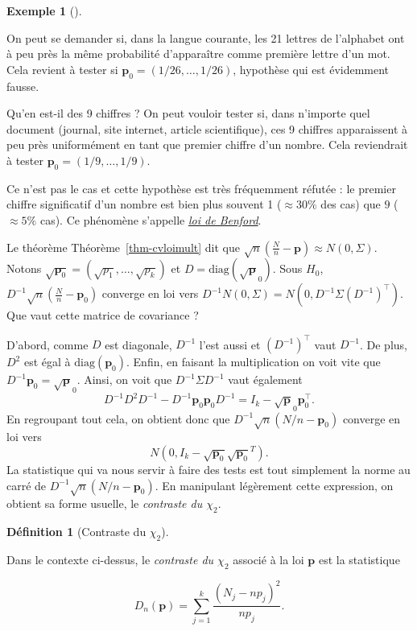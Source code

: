 \documentclass[
  10,
  letterpaper,
  DIV=11,
  numbers=noendperiod]{scrreport}
\theoremstyle{plain}
\theoremstyle{definition}
\theoremstyle{plain}
\theoremstyle{definition}
\newtheorem{definition}{Définition}[chapter]
\theoremstyle{definition}
\newtheorem{example}{Exemple}[chapter]
\theoremstyle{plain}
\theoremstyle{remark}
\begin{document}
\begin{example}[]\protect\hypertarget{exm-testadeq}{}\label{exm-testadeq}

On peut se demander si, dans la langue courante, les 21 lettres de
l'alphabet ont à peu près la même probabilité d'apparaître comme
première lettre d'un mot. Cela revient à tester si
\(\mathbf{p}_0=(1/26, \dotsc, 1/26)\), hypothèse qui est évidemment
fausse.

Qu'en est-il des 9 chiffres ? On peut vouloir tester si, dans n'importe
quel document (journal, site internet, article scientifique), ces 9
chiffres apparaissent à peu près uniformément en tant que premier
chiffre d'un nombre. Cela reviendrait à tester
\(\mathbf{p}_0 = (1/9, \dotsc, 1/9)\).

Ce n'est pas le cas et cette hypothèse est très fréquemment réfutée : le
premier chiffre significatif d'un nombre est bien plus souvent 1
(\(\approx 30\%\) des cas) que \(9\) (\(\approx 5\%\) cas). Ce phénomène
s'appelle \href{https://fr.wikipedia.org/wiki/Loi_de_Benford}{\emph{loi
de Benford}}.

\end{example}

Le théorème Théorème~\ref{thm-cvloimult} dit que
\(\sqrt{n}(\frac{N}{n}- \mathbf{p}) \approx N(0, \Sigma)\). Notons
\(\sqrt{\mathbf{p}_0} = (\sqrt{p_1}, \dotsc, \sqrt{p_k})\) et
\(D = \mathrm{diag}(\sqrt{\mathbf{p}}_0)\). Sous \(H_0\),
\(D^{-1} \sqrt{n}(\frac{N}{n}- \mathbf{p}_0)\) converge en loi vers
\(D^{-1}N(0,\Sigma) = N(0,D^{-1}\Sigma (D^{-1})^\top)\). Que vaut cette
matrice de covariance ?~

D'abord, comme \(D\) est diagonale, \(D^{-1}\) l'est aussi et
\((D^{-1})^\top\) vaut \(D^{-1}\). De plus, \(D^2\) est égal à
\(\mathrm{diag}(\mathbf{p}_0)\). Enfin, en faisant la multiplication on
voit vite que \(D^{-1}\mathbf{p}_0 = \sqrt{\mathbf{p}}_0\). Ainsi, on
voit que \(D^{-1}\Sigma D^{-1}\) vaut également
\[D^{-1}D^2 D^{-1} - D^{-1}\mathbf{p}_0 \mathbf{p}_0 D^{-1} = I_k - \sqrt{\mathbf{p}}_0 \mathbf{p}_0^{\top}.\]
En regroupant tout cela, on obtient donc que
\(D^{-1}\sqrt{n}(N/n - \mathbf{p}_0)\) converge en loi vers
\[N(0, I_k - \sqrt{\mathbf{p}_0} \sqrt{\mathbf{p}_0}^T).\] La
statistique qui va nous servir à faire des tests est tout simplement la
norme au carré de \(D^{-1}\sqrt{n}(N/n - \mathbf{p}_0)\). En manipulant
légèrement cette expression, on obtient sa forme usuelle, le
\emph{contraste du \(\chi_2\)}.

\begin{definition}[Contraste du
\(\chi_2\)]\protect\hypertarget{def-contraste}{}\label{def-contraste}

Dans le contexte ci-dessus, le \emph{contraste du \(\chi_2\)} associé à
la loi \(\mathbf{p}\) est la statistique

\[ D_n(\mathbf{p}) = \sum_{j=1}^k \frac{(N_j - n{p}_j)^2}{n{p}_j}.\]

\end{definition}
\end{document}
